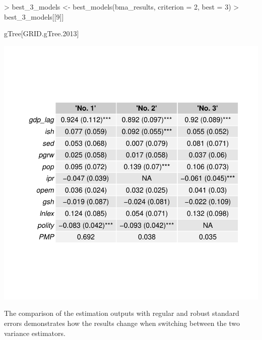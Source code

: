 \documentclass[a4paper]{article}
\begin{document}
\begin{Schunk}
\begin{Sinput}
> best_3_models <- best_models(bma_results, criterion = 2, best = 3)
> best_3_models[[9]]
\end{Sinput}
\begin{Soutput}
gTree[GRID.gTree.2013] 
\end{Soutput}
\end{Schunk}
\includegraphics{bdsm_vignette-019}

The comparison of the estimation outputs with regular and robust standard errors demonstrates how the results change when switching between the two variance estimators.
\end{document}

